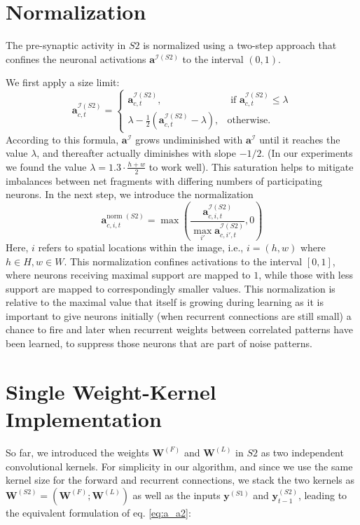\documentclass[12pt]{article}
\begin{document}
\section{Normalization}\label{sec:normalization}
The pre-synaptic activity in $S2$ is normalized using a two-step approach that confines the neuronal activations $\boldsymbol{a}^{\mathcal{I}(S2)}$ to the interval $(0,1)$. 

We first apply a size limit:
\begin{equation}
  \boldsymbol{a}^{\mathcal{I}(S2)}_{c,t} = \begin{cases}
   		\boldsymbol{a}^{\mathcal{I}(S2)}_{c,t}, & \text{ if } \boldsymbol{a}^{\mathcal{I}(S2)}_{c,t} \leq \lambda \\
   		\lambda - \frac{1}{2}(\boldsymbol{a}^{\mathcal{I}(S2)}_{c,t} - \lambda), & \text{otherwise}.
  	\end{cases}\label{eq:saturation}
\end{equation}
According to this formula, $\boldsymbol{a}^\mathcal{I}$ grows undiminished with $\boldsymbol{a}^\mathcal{I}$ until it reaches the value $\lambda$, and thereafter actually diminishes with slope $-1/2$. (In our experiments we found the value $\lambda = 1.3 \cdot \frac{h + w}{2}$ to work well). 
This saturation helps to mitigate imbalances between net fragments with differing numbers of participating neurons. In the next step, we introduce the normalization
\begin{equation}
    \boldsymbol{a}^{\text{norm }(S2)}_{c,i,t} = \max \left( \frac{\boldsymbol{a}^{\mathcal{I}(S2)}_{c,i,t}}{\max_{i'} \boldsymbol{a}^{\mathcal{I}(S2)}_{c,i',t}}
    \label{eq:normalization}, 0 \right)
\end{equation}
Here, $i$ refers to spatial locations within the image, i.e., $i=(h,w)$ where $h \in H, w \in W$.
This normalization confines activations to the interval $[0,1]$, where neurons receiving maximal support are mapped to $1$, while those with less support are mapped to correspondingly smaller values. 
This normalization is relative to the maximal value that itself is growing during learning as it is important to give neurons initially (when recurrent connections are still small) a chance to fire and later when recurrent weights between correlated patterns have been learned, to suppress those neurons that are part of noise patterns. 

\section{Single Weight-Kernel Implementation}
So far, we introduced the weights $\boldsymbol{W}^{(F)}$ and $\boldsymbol{W}^{(L)}$ in $S2$ as two independent convolutional kernels.
For simplicity in our algorithm, and since we use the same kernel size for the forward and recurrent connections, we stack the two kernels as $\boldsymbol{W}^{(S2)} = (\boldsymbol{W}^{(F)}; \boldsymbol{W}^{(L)})$ as well as the inputs $\boldsymbol{y}^{(S1)}$ and $\boldsymbol{y}^{(S2)}_{t-1}$, leading to the equivalent formulation of eq. \ref{eq:a_a2}:
\end{document}
